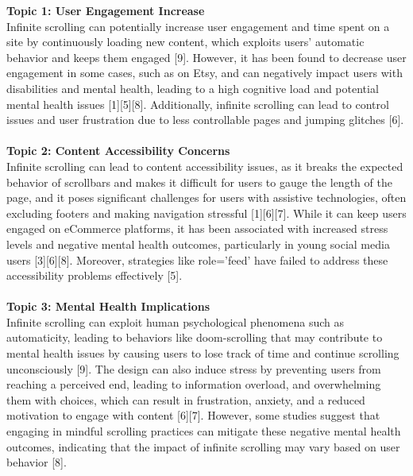 \begin{summary}[title={\modelTopic Summary: Is infinite scrolling a good web design technique? (ConflictingQA)}, label=summary2]
\textbf{Topic 1: User Engagement Increase}\\
Infinite scrolling can potentially increase user engagement and time spent on a site by continuously loading new content, which exploits users' automatic behavior and keeps them engaged [9]. However, it has been found to decrease user engagement in some cases, such as on Etsy, and can negatively impact users with disabilities and mental health, leading to a high cognitive load and potential mental health issues [1][5][8]. Additionally, infinite scrolling can lead to control issues and user frustration due to less controllable pages and jumping glitches [6].\\
\\
\textbf{Topic 2: Content Accessibility Concerns}\\
Infinite scrolling can lead to content accessibility issues, as it breaks the expected behavior of scrollbars and makes it difficult for users to gauge the length of the page, and it poses significant challenges for users with assistive technologies, often excluding footers and making navigation stressful [1][6][7]. While it can keep users engaged on eCommerce platforms, it has been associated with increased stress levels and negative mental health outcomes, particularly in young social media users [3][6][8]. Moreover, strategies like role='feed' have failed to address these accessibility problems effectively [5].\\
\\
\textbf{Topic 3: Mental Health Implications}\\
Infinite scrolling can exploit human psychological phenomena such as automaticity, leading to behaviors like doom-scrolling that may contribute to mental health issues by causing users to lose track of time and continue scrolling unconsciously [9]. The design can also induce stress by preventing users from reaching a perceived end, leading to information overload, and overwhelming them with choices, which can result in frustration, anxiety, and a reduced motivation to engage with content [6][7]. However, some studies suggest that engaging in mindful scrolling practices can mitigate these negative mental health outcomes, indicating that the impact of infinite scrolling may vary based on user behavior [8].
\end{summary}

\clearpage

